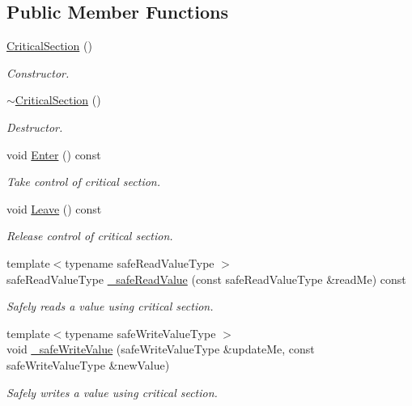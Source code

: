 \subsection*{Public Member Functions}
\begin{DoxyCompactItemize}
\item 
\hypertarget{class_critical_section_a7749425577cdeee2d32815e63d96e9ff}{
\hyperlink{class_critical_section_a7749425577cdeee2d32815e63d96e9ff}{CriticalSection} ()}
\label{class_critical_section_a7749425577cdeee2d32815e63d96e9ff}

\begin{DoxyCompactList}\small\item\em Constructor. \item\end{DoxyCompactList}\item 
\hypertarget{class_critical_section_a8f10b99e9550811be81a0ca409171bcc}{
\hyperlink{class_critical_section_a8f10b99e9550811be81a0ca409171bcc}{$\sim$CriticalSection} ()}
\label{class_critical_section_a8f10b99e9550811be81a0ca409171bcc}

\begin{DoxyCompactList}\small\item\em Destructor. \item\end{DoxyCompactList}\item 
void \hyperlink{class_critical_section_a509be5342b2f07ae06e1af5d9e08b871}{Enter} () const 
\begin{DoxyCompactList}\small\item\em Take control of critical section. \item\end{DoxyCompactList}\item 
void \hyperlink{class_critical_section_a6fa0931385f066492f31fc98e3fca657}{Leave} () const 
\begin{DoxyCompactList}\small\item\em Release control of critical section. \item\end{DoxyCompactList}\item 
{\footnotesize template$<$typename safeReadValueType $>$ }\\safeReadValueType \hyperlink{class_critical_section_a42d10fa49e137fb32555953626c2967e}{\_\-safeReadValue} (const safeReadValueType \&readMe) const 
\begin{DoxyCompactList}\small\item\em Safely reads a value using critical section. \item\end{DoxyCompactList}\item 
{\footnotesize template$<$typename safeWriteValueType $>$ }\\void \hyperlink{class_critical_section_ad2e98b159232005f4fa8c8f71e3de3a5}{\_\-safeWriteValue} (safeWriteValueType \&updateMe, const safeWriteValueType \&newValue)
\begin{DoxyCompactList}\small\item\em Safely writes a value using critical section. \item\end{DoxyCompactList}\end{DoxyCompactItemize}

